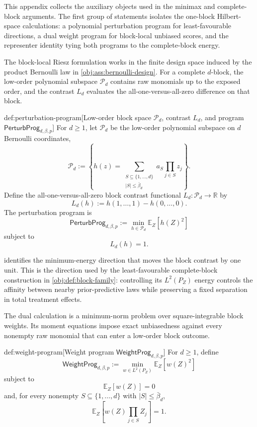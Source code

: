 \documentclass[11pt]{article}
\begin{document}
This appendix collects the auxiliary objects used in the minimax and complete-block arguments. The first group of statements isolates the one-block Hilbert-space calculations: a polynomial perturbation program for least-favourable directions, a dual weight program for block-local unbiased scores, and the representer identity tying both programs to the complete-block energy.

The block-local Riesz formulation works in the finite design space induced by the product Bernoulli law in \cref{obj:ass:bernoulli-design}. For a complete \(d\)-block, the low-order polynomial subspace \(\mathcal P_d\) contains raw monomials up to the exposed order, and the contrast \(L_d\) evaluates the all-one-versus-all-zero difference on that block.

\begin{definitionv}{def:perturbation-program}[Low-order block space $\mathcal P_d$, contrast $L_d$, and program $\mathsf{PerturbProg}_{d,\beta,p}$]
For \(d\ge 1\), let \(\mathcal P_d\) be the low-order polynomial subspace on \(d\) Bernoulli coordinates,
\[
\mathcal P_d
:=
\left\{
h(z)=\sum_{\substack{S\subseteq \{1,\ldots,d\}\\ |S|\le \bar\beta_d}}
a_S\prod_{j\in S}z_j
\right\}.
\]
Define the all-one-versus-all-zero block contrast functional \(L_d:\mathcal P_d\to\mathbb R\) by
\[
L_d(h)
:=
h(1,\ldots,1)-h(0,\ldots,0).
\]
The perturbation program is
\[
\mathsf{PerturbProg}_{d,\beta,p}
:=
\min_{h\in\mathcal P_d}\mathbb E_Z[h(Z)^2]
\]
subject to
\[
L_d(h)=1.
\]
\end{definitionv}

 identifies the minimum-energy direction that moves the block contrast by one unit. This is the direction used by the least-favourable complete-block construction in \cref{obj:def:block-family}: controlling its \(L^2(P_Z)\) energy controls the affinity between nearby prior-predictive laws while preserving a fixed separation in total treatment effects.

The dual calculation is a minimum-norm problem over square-integrable block weights. Its moment equations impose exact unbiasedness against every nonempty raw monomial that can enter a low-order block outcome.

\begin{definitionv}{def:weight-program}[Weight program \(\mathsf{WeightProg}_{d,\beta,p}\)]
For \(d\ge 1\), define
\[
\mathsf{WeightProg}_{d,\beta,p}
:=
\min_{w\in L^2(P_Z)}\mathbb E_Z[w(Z)^2]
\]
subject to
\[
\mathbb E_Z[w(Z)]=0
\]
and, for every nonempty \(S\subseteq\{1,\ldots,d\}\) with \(|S|\le\bar\beta_d\),
\[
\mathbb E_Z\left[w(Z)\prod_{j\in S}Z_j\right]=1.
\]
\end{definitionv}
\end{document}
